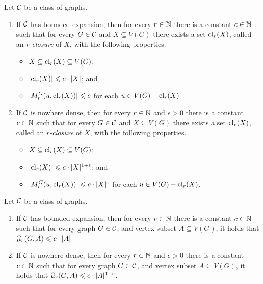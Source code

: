 \pagebreak
\begin{lemma}[[\cite{drange2016kernelization,eickmeyer2016neighborhood}]\label{lem:closure}
Let $\mathcal{C}$ be a class of graphs. 
\begin{enumerate}
\item If $\mathcal{C}$ has bounded expansion, then for every $r\in \mathbb{N}$ there is a constant $c\in \mathbb{N}$ such that for
every $G\in \mathcal{C}$ and $X\subseteq V(G)$ there exists a set $\mathrm{cl}_r(X)$, called an {\em{$r$-closure}} of $X$, with the following properties. 
\begin{itemize}
  \item $X\subseteq \mathrm{cl}_r(X)\subseteq V(G)$;
  \item $|\mathrm{cl}_r(X)|\leqslant c\cdot |X|$; and
  \item $|M_r^G(u,\mathrm{cl}_r(X))|\leqslant c$ for each $u\in V(G)- \mathrm{cl}_r(X)$.
\end{itemize}
\item If $\mathcal{C}$ is nowhere dense, then for every $r\in\mathbb{N}$ and $\epsilon>0$ there is a 
constant $c\in\mathbb{N}$ such that for every $G\in \mathcal{C}$ and $X\subseteq V(G)$ there exists a set 
$\mathrm{cl}_r(X)$,  called an {\em{$r$-closure}} of $X$, 
with the following properties. 
\begin{itemize}
  \item $X\subseteq \mathrm{cl}_r(X)\subseteq V(G)$;
  \item $|\mathrm{cl}_r(X)|\leqslant c\cdot |X|^{1+\varepsilon}$; and
  \item $|M_r^G(u,\mathrm{cl}_r(X))|\leqslant c\cdot |X|^{\varepsilon}$ for each $u\in V(G)- \mathrm{cl}_r(X)$.
\end{itemize}
\end{enumerate}
\end{lemma}

\begin{lemma}\label{lem:projection-complexity}
Let $\mathcal{C}$ be a class of graphs. 
\begin{enumerate}
\item If $\mathcal{C}$ has bounded expansion, then for every $r\in \mathbb{N}$ there is 
  a constant $c\in\mathbb{N}$ such that for every graph $G\in \mathcal{C}$, and vertex subset $A\subseteq V(G)$, 
  it holds that $\widehat{\mu}_r(G,A)\leqslant c\cdot |A|$.
  \item If $\mathcal{C}$ is nowhere dense, then for every $r\in \mathbb{N}$ and $\epsilon>0$ there is 
  a constant $c\in \mathbb{N}$ such that for every graph $G\in \mathcal{C}$, and vertex subset $A\subseteq V(G)$, 
  it holds that $\widehat{\mu}_r(G,A)\leqslant c\cdot |A|^{1+\varepsilon}$.
\end{enumerate}
\end{lemma}

